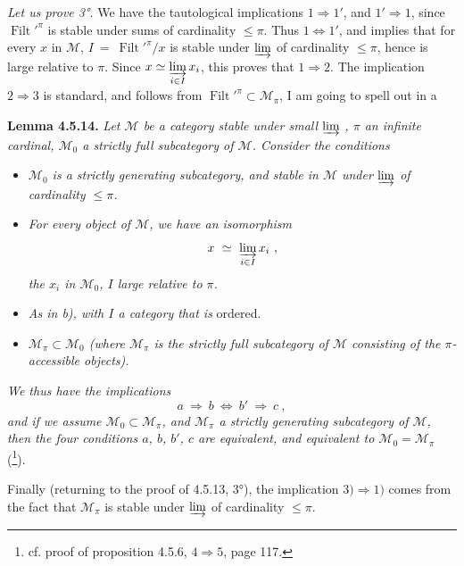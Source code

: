 \documentclass[11pt]{article}
\newcommand{\printedpage}[1]{\marginpar{\footnotesize p.~#1}}
\newcommand{\msp}[1]{\marginpar{\footnotesize [#1]}}
\newcommand{\Filt}{\operatorname{Filt}}
\begin{document}
\textit{Let us prove 3°.} We have the tautological implications $1 \Longrightarrow 1'$, and $1' \Longrightarrow 1$, since $\Filt'^{\pi}$ is stable under sums of cardinality $\leqslant \pi$. Thus $1 \Longleftrightarrow 1'$, and implies that for every $x$ in $\mathcal{M}$,
\msp{page 133}
$I \ = \ \Filt'^{\pi}/x$ is stable under $\varinjlim$ of cardinality $\leqslant \pi$, hence is large relative to $\pi$. Since $x \simeq \varinjlim\limits_{i\in I} x_i$, this proves that $1 \Longrightarrow 2$. The implication $2 \Longrightarrow 3$ is standard, and follows from $\Filt'^{\pi} \subset \mathcal{M}_{\pi}$, I am going to spell out in a

\textbf{Lemma 4.5.14.} \textit{Let $\mathcal{M}$ be a category stable under small} $\varinjlim$ \textit{, $\pi$ an infinite cardinal, $\mathcal{M}_0$ a strictly full subcategory of $\mathcal{M}$. Consider the conditions}
\begin{itemize}
\item[\textit{a)}] \textit{$\mathcal{M}_0$ is a strictly generating subcategory, and stable in $\mathcal{M}$ under} $\varinjlim$ \textit{of cardinality $\leqslant \pi$.}
\item[\textit{b)}] \textit{For every object of $\mathcal{M}$, we have an isomorphism}
\[ x \ \simeq \ \varinjlim_{i\in I} x_i \ , \]
\textit{the $x_i$ in $\mathcal{M}_0$, $I$ large relative to $\pi$.}

\printedpage{42}
\item[\textit{b$'$)}] \textit{As in b), with $I$ a category that is} ordered.
\item[\textit{c)}] \textit{$\mathcal{M}_{\pi} \subset \mathcal{M}_0$ (where $\mathcal{M}_{\pi}$ is the strictly full subcategory of $\mathcal{M}$ consisting of the $\pi$-accessible objects).}
\end{itemize}
\textit{We thus have the implications}
\[ a \ \Longrightarrow \ b \ \Longleftrightarrow \ b' \ \Longrightarrow \ c \ , \]
\textit{and if we assume $\mathcal{M}_0 \subset \mathcal{M}_{\pi}$, and $\mathcal{M}_{\pi}$ a strictly generating subcategory of $\mathcal{M}$, then the four conditions $a$, $b$, $b'$, $c$ are equivalent, and equivalent to $\mathcal{M}_0 = \mathcal{M}_{\pi}$} (\footnote{cf. proof of proposition 4.5.6, $4 \Longrightarrow 5$, page 117.}).

\msp{page 134}
Finally (returning to the proof of 4.5.13, 3°), the implication $3) \Longrightarrow 1)$ comes from the fact that $\mathcal{M}_{\pi}$ is stable under $\varinjlim$ of cardinality $\leqslant \pi$.
\end{document}
